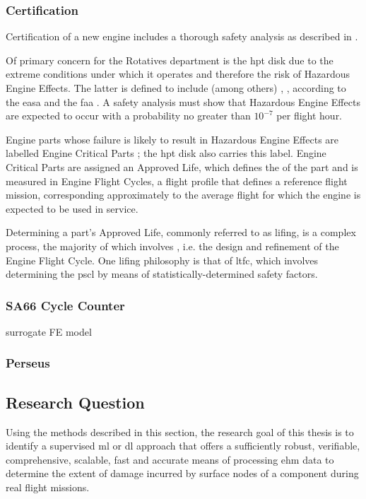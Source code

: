 \subsubsection{Certification}
\label{certif}
Certification of a new engine includes a thorough safety analysis as described in \cite{easa_certification_2015}.

Of primary concern for the Rotatives department is the \ac{hpt} disk due to the extreme conditions under which it operates and therefore the risk of Hazardous Engine Effects. The latter is defined to include (among others) , ,  according to the \ac{easa} and the \ac{faa} \cite{easa_certification_2015, faa_guidance_2007}. A safety analysis must show that Hazardous Engine Effects are expected to occur with a probability no greater than \(10^{-7}\) per flight hour.

Engine parts whose failure is likely to result in Hazardous Engine Effects are labelled Engine Critical Parts \cite{easa_certification_2015}; the \ac{hpt} disk also carries this label. Engine Critical Parts are assigned an Approved Life, which defines the  \cite{easa_certification_2015} of the part and is measured in Engine Flight Cycles, a flight profile that defines a reference flight mission, corresponding approximately to the average flight for which the engine is expected to be used in service.

Determining a part's Approved Life, commonly referred to as lifing, is a complex process, the majority of which involves  \cite{corran_lifing_2007}, i.e. the design and refinement of the Engine Flight Cycle. One lifing philosophy is that of \ac{ltfc}, which involves determining the \ac{pscl} by means of statistically-determined safety factors.

\subsubsection{SA66 Cycle Counter}
\label{sa66}
surrogate FE model

\subsubsection{Perseus}
\label{pers}


\subsection{Research Question}
Using the methods described in this section, the research goal of this thesis is to identify a supervised \ac{ml} or \ac{dl} approach that offers a sufficiently robust, verifiable, comprehensive, scalable, fast and accurate means of processing \ac{ehm} data to determine the extent of damage incurred by surface nodes of a component during real flight missions.